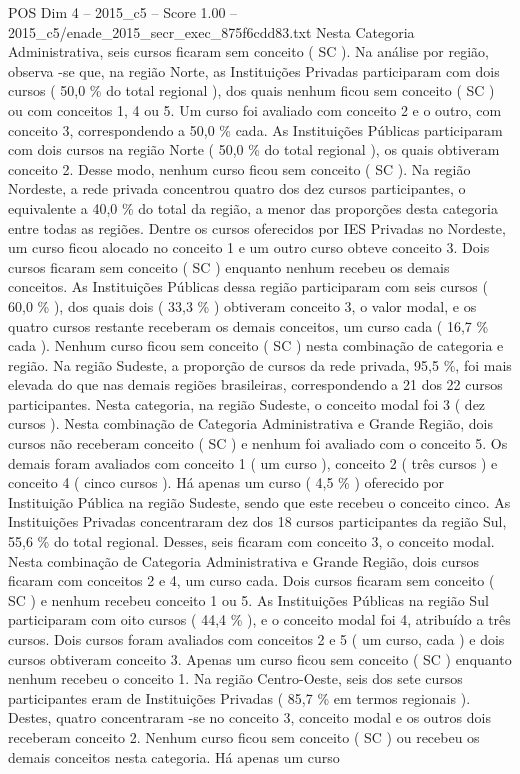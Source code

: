 \begin{textsample}{POS Dim 4 – 2015\_c5 – Score 1.00 – 2015\_c5/enade\_2015\_secr\_exec\_875f6cdd83.txt}
Nesta Categoria Administrativa, seis cursos ficaram sem conceito ( SC ).
Na análise por região, observa -se que, na região Norte, as Instituições Privadas participaram com dois cursos ( 50,0 \% do total regional ), dos quais nenhum ficou sem conceito ( SC ) ou com conceitos 1, 4 ou 5.
Um curso foi avaliado com conceito 2 e o outro, com conceito 3, correspondendo a 50,0 \% cada.
As Instituições Públicas participaram com dois cursos na região Norte ( 50,0 \% do total regional ), os quais obtiveram conceito 2.
Desse modo, nenhum curso ficou sem conceito ( SC ).
Na região Nordeste, a rede privada concentrou quatro dos dez cursos participantes, o equivalente a 40,0 \% do total da região, a menor das proporções desta categoria entre todas as regiões.
Dentre os cursos oferecidos por IES Privadas no Nordeste, um curso ficou alocado no conceito 1 e um outro curso obteve conceito 3.
Dois cursos ficaram sem conceito ( SC ) enquanto nenhum recebeu os demais conceitos.
As Instituições Públicas dessa região participaram com seis cursos ( 60,0 \% ), dos quais dois ( 33,3 \% ) obtiveram conceito 3, o valor modal, e os quatro cursos restante receberam os demais conceitos, um curso cada ( 16,7 \% cada ).
Nenhum curso ficou sem conceito ( SC ) nesta combinação de categoria e região.
Na região Sudeste, a proporção de cursos da rede privada, 95,5 \%, foi mais elevada do que nas demais regiões brasileiras, correspondendo a 21 dos 22 cursos participantes.
Nesta categoria, na região Sudeste, o conceito modal foi 3 ( dez cursos ).
Nesta combinação de Categoria Administrativa e Grande Região, dois cursos não receberam conceito ( SC ) e nenhum foi avaliado com o conceito 5.
Os demais foram avaliados com conceito 1 ( um curso ), conceito 2 ( três cursos ) e conceito 4 ( cinco cursos ).
Há apenas um curso ( 4,5 \% ) oferecido por Instituição Pública na região Sudeste, sendo que este recebeu o conceito cinco.
As Instituições Privadas concentraram dez dos 18 cursos participantes da região Sul, 55,6 \% do total regional.
Desses, seis ficaram com conceito 3, o conceito modal.
Nesta combinação de Categoria Administrativa e Grande Região, dois cursos ficaram com conceitos 2 e 4, um curso cada.
Dois cursos ficaram sem conceito ( SC ) e nenhum recebeu conceito 1 ou 5.
As Instituições Públicas na região Sul participaram com oito cursos ( 44,4 \% ), e o conceito modal foi 4, atribuído a três cursos.
Dois cursos foram avaliados com conceitos 2 e 5 ( um curso, cada ) e dois cursos obtiveram conceito 3.
Apenas um curso ficou sem conceito ( SC ) enquanto nenhum recebeu o conceito 1.
Na região Centro-Oeste, seis dos sete cursos participantes eram de Instituições Privadas ( 85,7 \% em termos regionais ).
Destes, quatro concentraram -se no conceito 3, conceito modal e os outros dois receberam conceito 2.
Nenhum curso ficou sem conceito ( SC ) ou recebeu os demais conceitos nesta categoria.
Há apenas um curso

\end{textsample}
